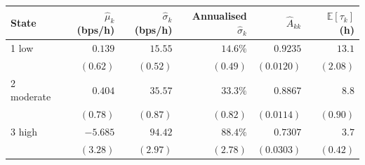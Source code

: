 \begin{tabular}{lrrrrr}
\toprule
State & $\hat\mu_k$ (bps/h) & $\hat\sigma_k$ (bps/h) & Annualised $\hat\sigma_k$ & $\hat A_{kk}$ & $\mathbb{E}[\tau_k]$ (h) \\
\midrule
1 low      & $0.139$  & $15.55$ & $14.6\%$ & $0.9235$ & $13.1$ \\
           & $(0.62)$ & $(0.52)$ & $(0.49)$ & $(0.0120)$ & $(2.08)$ \\
2 moderate & $0.404$  & $35.57$ & $33.3\%$ & $0.8867$ & $8.8$ \\
           & $(0.78)$ & $(0.87)$ & $(0.82)$ & $(0.0114)$ & $(0.90)$ \\
3 high     & $-5.685$ & $94.42$ & $88.4\%$ & $0.7307$ & $3.7$ \\
           & $(3.28)$ & $(2.97)$ & $(2.78)$ & $(0.0303)$ & $(0.42)$ \\
\bottomrule
\end{tabular}
